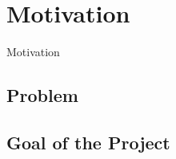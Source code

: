 \section{Motivation}
\begin{frame}
	\begin{center}
	\huge{Motivation}
	\end{center}
\end{frame}

\subsection*{Problem}


\subsection*{Goal of the Project}

